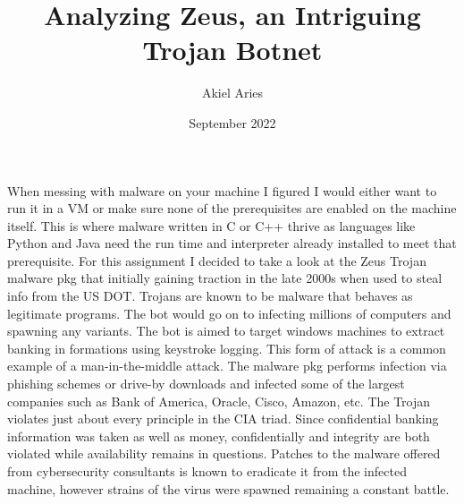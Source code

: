 \documentclass[12pt, letterpaper]{article}
\title{Analyzing Zeus, an Intriguing Trojan Botnet}
\author{Akiel Aries}
\date{September 2022}
\begin{document}
\maketitle


When messing with malware on your machine I figured I would either want 
to run it in a VM or make sure none of the prerequisites are enabled on
the machine itself. This is where malware written in C or C++ thrive as
languages like Python and Java need the run time and interpreter already
installed to meet that prerequisite. For this assignment I decided to
take a look at the Zeus Trojan malware pkg that initially gaining
traction in the late 2000s when used to steal info from the US DOT.
Trojans are known to be malware that behaves as legitimate programs. The
bot would go on to infecting millions of computers and spawning any
variants. The bot is aimed to target windows machines to extract banking
in formations using keystroke logging. This form of attack is a common
example of a man-in-the-middle attack. The malware pkg performs
infection via phishing schemes or drive-by downloads and infected some
of the largest companies such as Bank of America, Oracle, Cisco, Amazon,
etc. The Trojan violates just about every principle in the CIA triad.
Since confidential banking information was taken as well as money,
confidentially and integrity are both violated while availability
remains in questions. Patches to the malware offered from cybersecurity
consultants is known to eradicate it from the infected machine, however
strains of the virus were spawned remaining a constant battle.
\end{document}
